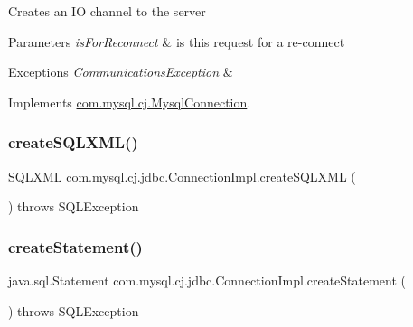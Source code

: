 Creates an IO channel to the server


\begin{DoxyParams}{Parameters}
{\em is\+For\+Reconnect} & is this request for a re-\/connect \\
\hline
\end{DoxyParams}

\begin{DoxyExceptions}{Exceptions}
{\em Communications\+Exception} & \\
\hline
\end{DoxyExceptions}


Implements \mbox{\hyperlink{interfacecom_1_1mysql_1_1cj_1_1_mysql_connection_a95370bad49129eb6c1f5136e008e6ed1}{com.\+mysql.\+cj.\+Mysql\+Connection}}.

\mbox{\label{classcom_1_1mysql_1_1cj_1_1jdbc_1_1_connection_impl_aeeb7d7b1a8e169c26b7fd49b1d428dbe}} 
\subsubsection{\texorpdfstring{create\+S\+Q\+L\+X\+M\+L()}{createSQLXML()}}
{\footnotesize\ttfamily S\+Q\+L\+X\+ML com.\+mysql.\+cj.\+jdbc.\+Connection\+Impl.\+create\+S\+Q\+L\+X\+ML (\begin{DoxyParamCaption}{ }\end{DoxyParamCaption}) throws S\+Q\+L\+Exception}

\mbox{\label{classcom_1_1mysql_1_1cj_1_1jdbc_1_1_connection_impl_ac07000b85a6e8197ac8ca945bc44bbec}} 
\subsubsection{\texorpdfstring{create\+Statement()}{createStatement()}\hspace{0.1cm}{\footnotesize\ttfamily [1/3]}}
{\footnotesize\ttfamily java.\+sql.\+Statement com.\+mysql.\+cj.\+jdbc.\+Connection\+Impl.\+create\+Statement (\begin{DoxyParamCaption}{ }\end{DoxyParamCaption}) throws S\+Q\+L\+Exception}


